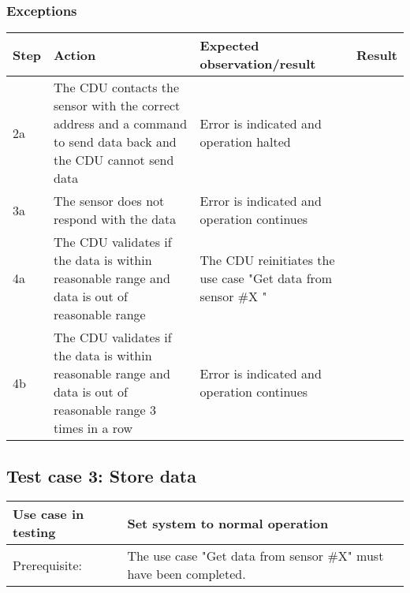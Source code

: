 \subsubsection{Exceptions}
\begin{table}[H]
    \begin{tabular}{|l|p{7cm}|p{5cm}|l|}
    \hline
    Step & Action & Expected observation/result & Result \\ \hline
    2a & The CDU contacts the sensor with the correct address and a command to send data back and the CDU cannot send data & Error is indicated and operation halted & ~ \\ \hline
    3a & The sensor does not respond with the data & Error is indicated and operation continues & ~ \\ \hline
    4a & The CDU validates if the data is within reasonable range and data is out of reasonable range & The CDU reinitiates the use case "Get data from sensor \#X " & ~ \\ \hline
    4b & The CDU validates if the data is within reasonable range and data is out of reasonable range 3 times in a row & Error is indicated and operation continues & ~ \\ \hline
    \end{tabular}
\end{table}

\subsection{Test case 3: Store data}
\begin{table}[H]
    \begin{tabular}{|l|p{7cm}|}
    \hline
    Use case in testing & Set system to normal operation \\ \hline
    Prerequisite: & The use case "Get data from sensor \#X" must have been completed. \\ \hline
    \end{tabular}
\end{table}

